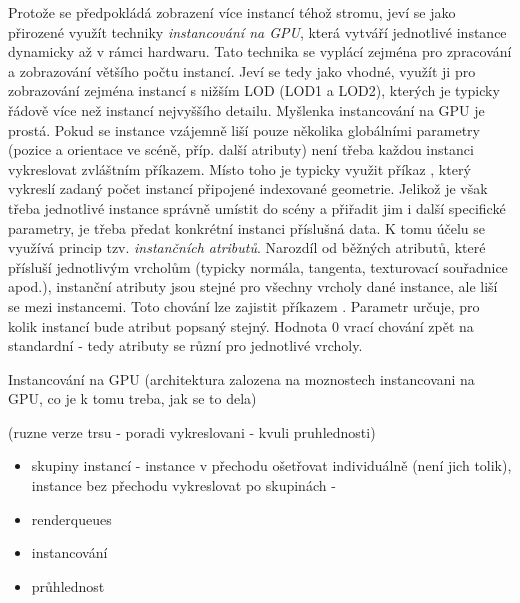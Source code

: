 Protože se předpokládá zobrazení více instancí téhož stromu, jeví se jako přirozené využít techniky \emph{instancování na GPU}, která vytváří jednotlivé instance dynamicky až v rámci hardwaru. Tato technika se vyplácí zejména pro zpracování a zobrazování většího počtu instancí. Jeví se tedy jako vhodné, využít ji pro zobrazování zejména instancí s nižším LOD (LOD1 a LOD2), kterých je typicky řádově více než instancí nejvyššího detailu. Myšlenka instancování na GPU je prostá. Pokud se instance vzájemně liší pouze několika globálními parametry (pozice a orientace ve scéně, příp. další atributy) není třeba každou instanci vykreslovat zvláštním příkazem. Místo toho je typicky využit příkaz , který vykreslí zadaný počet instancí připojené indexované geometrie. Jelikož je však třeba jednotlivé instance správně umístit do scény a přiřadit jim i další specifické parametry, je třeba předat konkrétní instanci příslušná data. K tomu účelu se využívá princip tzv. \emph{instančních atributů}. Narozdíl od běžných atributů, které přísluší jednotlivým vrcholům (typicky normála, tangenta, texturovací souřadnice apod.), instanční atributy jsou stejné pro všechny vrcholy dané instance, ale liší se mezi instancemi. Toto chování lze zajistit příkazem . Parametr  určuje, pro kolik instancí bude atribut popsaný  stejný. Hodnota $0$ vrací chování zpět na standardní - tedy atributy se různí pro jednotlivé vrcholy.




Instancování na GPU 
(architektura zalozena na moznostech instancovani na GPU, co je k tomu treba, jak se to dela)

(ruzne verze trsu - poradi vykreslovani - kvuli pruhlednosti)

\begin{itemize}
\item skupiny instancí - instance v přechodu ošetřovat individuálně (není jich tolik), instance bez přechodu  vykreslovat po skupinách - 
\item renderqueues
\item instancování
\item průhlednost
\end{itemize}